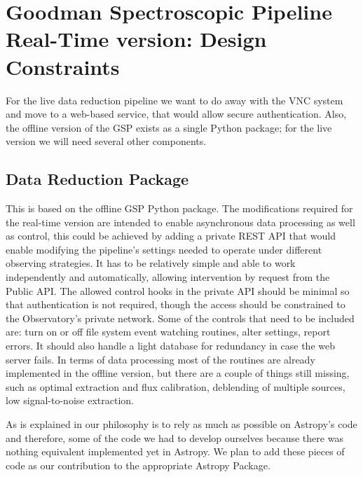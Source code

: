 \documentclass[11pt,twoside]{article}
\begin{document}
\section{Goodman Spectroscopic Pipeline Real-Time version: Design Constraints}

For the live data reduction pipeline we want to do away with the VNC system and move to a web-based service, that would allow secure authentication. Also, the offline version of the GSP exists as a single Python package; for the live version  we will need several other components.


\subsection{Data Reduction Package}

This is based on the offline GSP Python package. The modifications required for the real-time version are intended to enable asynchronous data processing as well as control, this could be achieved by adding a private REST API that would enable modifying the pipeline's settings needed to operate under different observing strategies. It has to be relatively simple and able to work independently and automatically, allowing intervention by request from the Public API. 
The allowed control hooks in the private API should be minimal so that authentication is not required, though the access should be constrained to the Observatory's private network. Some of the controls that need to be included are: turn on or off file system event watching routines, alter settings, report errors. It should also handle a light database for redundancy in case the web server fails.
In terms of data processing most of the routines are already implemented in the offline version, but there are a couple of things still missing, such as optimal extraction \citet{1989PASP..101.1032M} and  \citet{1986PASP...98..609H} flux calibration, deblending of multiple sources, low signal-to-noise extraction.

As is explained in \citet{P9-115_adassxxvii} our philosophy is to rely as much as possible on Astropy's code  \citet{2013A&A...558A..33A} and \citet{2018AJ....156..123A} therefore, some of the code we had to develop ourselves because there was nothing equivalent implemented yet in Astropy. We plan to add these pieces of code as our contribution to the appropriate Astropy Package.
\end{document}

